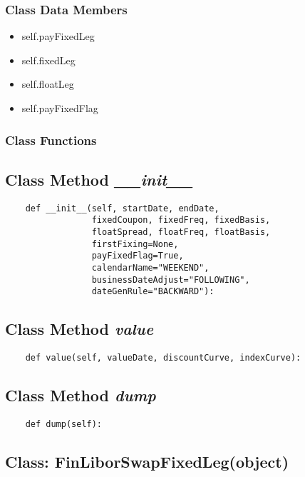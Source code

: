 \documentclass[twoside,11pt]{book}
\begin{document}
\subsubsection{Class Data Members}
\begin{itemize}
\item{self.payFixedLeg}
\item{self.fixedLeg}
\item{self.floatLeg}
\item{self.payFixedFlag}
\end{itemize}

\subsubsection{Class Functions}

\subsection{Class Method {\it \_\_init\_\_}}


\begin{lstlisting}
    def __init__(self, startDate, endDate,
                 fixedCoupon, fixedFreq, fixedBasis,
                 floatSpread, floatFreq, floatBasis,
                 firstFixing=None,
                 payFixedFlag=True,
                 calendarName="WEEKEND",
                 businessDateAdjust="FOLLOWING",
                 dateGenRule="BACKWARD"):
\end{lstlisting}

\subsection{Class Method {\it value}}


\begin{lstlisting}
    def value(self, valueDate, discountCurve, indexCurve):
\end{lstlisting}

\subsection{Class Method {\it dump}}


\begin{lstlisting}
    def dump(self):
\end{lstlisting}

\subsection{Class: FinLiborSwapFixedLeg(object)}
\end{document}
